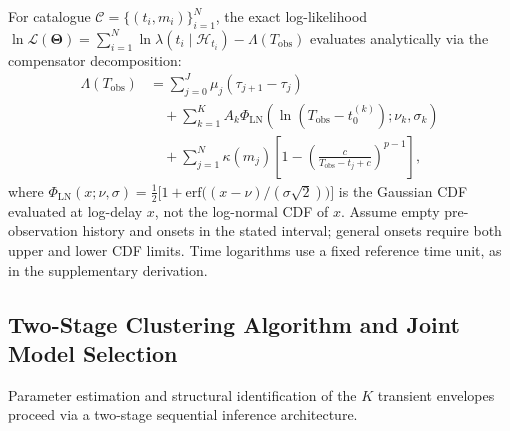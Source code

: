 \begin{proposition}
  \label{prop:analytical_loglik}
  For catalogue $\mathcal{C} = \{(t_i, m_i)\}_{i=1}^N$, the exact
  log-likelihood $\ln \mathcal{L}(\bm{\Theta}) =
  \sum_{i=1}^N \ln \lambda(t_i \mid \mathcal{H}_{t_i}) -
  \Lambda(T_{\mathrm{obs}})$ evaluates analytically via the
  compensator decomposition:
  \begin{equation}
    \begin{aligned}
      \Lambda(T_{\mathrm{obs}})
      &=\sum_{j=0}^{J}\mu_j(\tau_{j+1}-\tau_j) \\
      &\quad+\sum_{k=1}^{K}A_k\Phi_{\mathrm{LN}}\!
      \left(\ln(T_{\mathrm{obs}}-t_0^{(k)});\nu_k,\sigma_k\right) \\
      &\quad+\sum_{j=1}^{N}\kappa(m_j)
      \left[1-\left(\frac{c}{T_{\mathrm{obs}}-t_j+c}\right)^{p-1}\right],
    \end{aligned}
    \label{eq:analytical_compensator}
  \end{equation}
  where $\Phi_{\mathrm{LN}}(x; \nu, \sigma) = \frac{1}{2}\bigl[1 +
  \mathrm{erf}\bigl((x - \nu)/(\sigma\sqrt{2})\bigr)\bigr]$ is the
  Gaussian CDF evaluated at log-delay $x$, not the log-normal CDF of $x$.
  Assume empty pre-observation history and onsets in the stated interval;
  general onsets require both upper and lower CDF limits. Time logarithms
  use a fixed reference time unit, as in the supplementary derivation.
\end{proposition}

\subsection{Two-Stage Clustering Algorithm and Joint Model Selection}
\label{subsec:two_stage_clustering}

Parameter estimation and structural identification of the $K$
transient envelopes proceed via a two-stage sequential inference architecture.

